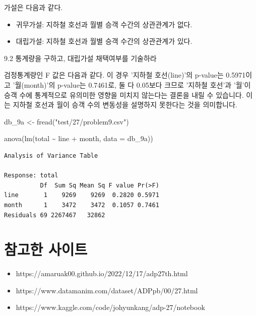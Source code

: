 \documentclass[
  letterpaper,
  DIV=11,
  numbers=noendperiod]{scrreprt}
\newenvironment{Shaded}{\begin{snugshade}}{\end{snugshade}}
\newcommand{\AttributeTok}[1]{\textcolor[rgb]{0.40,0.45,0.13}{#1}}
\newcommand{\FunctionTok}[1]{\textcolor[rgb]{0.28,0.35,0.67}{#1}}
\newcommand{\NormalTok}[1]{\textcolor[rgb]{0.00,0.23,0.31}{#1}}
\newcommand{\OtherTok}[1]{\textcolor[rgb]{0.00,0.23,0.31}{#1}}
\newcommand{\SpecialCharTok}[1]{\textcolor[rgb]{0.37,0.37,0.37}{#1}}
\newcommand{\StringTok}[1]{\textcolor[rgb]{0.13,0.47,0.30}{#1}}
\providecommand{\tightlist}{%
  \setlength{\itemsep}{0pt}\setlength{\parskip}{0pt}}\usepackage{longtable,booktabs,array}
\begin{document}
가설은 다음과 같다.

\begin{itemize}
\tightlist
\item
  귀무가설: 지하철 호선과 월별 승객 수간의 상관관계가 없다.
\item
  대립가설: 지하철 호선과 월별 승객 수간의 상관관계가 있다.
\end{itemize}

9.2 통계량을 구하고, 대립가설 채택여부를 기술하라

검정통계량인 F 값은 다음과 같다. 이 경우 '지하철 호선(line)'의 p-value는
0.5971이고 '월(month)'의 p-value는 0.7461로, 둘 다 0.05보다 크므로
'지하철 호선'과 '월'이 승객 수에 통계적으로 유의미한 영향을 미치지
않는다는 결론을 내릴 수 있습니다. 이는 지하철 호선과 월이 승객 수의
변동성을 설명하지 못한다는 것을 의미합니다.

\begin{Shaded}
\begin{Highlighting}[]
\NormalTok{db\_9a }\OtherTok{\textless{}{-}} \FunctionTok{fread}\NormalTok{(}\StringTok{"test/27/problem9.csv"}\NormalTok{)}

\FunctionTok{anova}\NormalTok{(}\FunctionTok{lm}\NormalTok{(total }\SpecialCharTok{\textasciitilde{}}\NormalTok{ line }\SpecialCharTok{+}\NormalTok{ month, }\AttributeTok{data =}\NormalTok{ db\_9a))}
\end{Highlighting}
\end{Shaded}

\begin{verbatim}
Analysis of Variance Table

Response: total
          Df  Sum Sq Mean Sq F value Pr(>F)
line       1    9269    9269  0.2820 0.5971
month      1    3472    3472  0.1057 0.7461
Residuals 69 2267467   32862               
\end{verbatim}

\hypertarget{uxcc38uxace0uxd55c-uxc0acuxc774uxd2b8}{%
\chapter*{참고한 사이트}\label{uxcc38uxace0uxd55c-uxc0acuxc774uxd2b8}}


\begin{itemize}
\tightlist
\item
  https://amaruak00.github.io/2022/12/17/adp27th.html
\item
  https://www.datamanim.com/dataset/ADPpb/00/27.html
\item
  https://www.kaggle.com/code/johyunkang/adp-27/notebook
\end{itemize}
\end{document}
